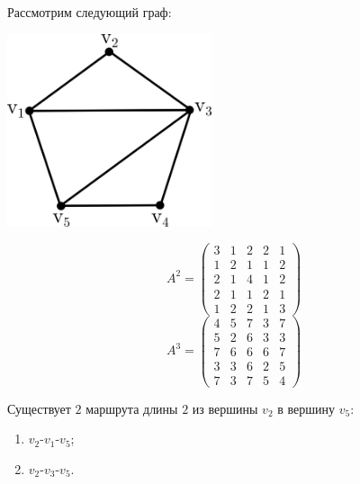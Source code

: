 \begin{example*}
    Рассмотрим следующий граф:

    \begin{multicols}{2}
        \null \vfill
        \begin{center}
            \includegraphics[width=0.45\textwidth]{images/adjacency-matrix-example.png}
        \end{center}
        \vfill \null

        \columnbreak

        \[
            A^2 =
            \begin{pmatrix}
                3 & 1 & 2 & 2 & 1 \\
                1 & 2 & 1 & 1 & 2 \\
                2 & 1 & 4 & 1 & 2 \\
                2 & 1 & 1 & 2 & 1 \\
                1 & 2 & 2 & 1 & 3
            \end{pmatrix}
        \]
        \[
            A^3 =
            \begin{pmatrix}
                4 & 5 & 7 & 3 & 7 \\
                5 & 2 & 6 & 3 & 3 \\
                7 & 6 & 6 & 6 & 7 \\
                3 & 3 & 6 & 2 & 5 \\
                7 & 3 & 7 & 5 & 4
            \end{pmatrix}
        \]
    \end{multicols}

    \noindent Существует \(2\) маршрута длины \(2\) из вершины \(v_2\) в вершину \(v_5\):
    \begin{enumerate}
        \item \(v_2\)-\(v_1\)-\(v_5\);
        \item \(v_2\)-\(v_3\)-\(v_5\).
    \end{enumerate}


\end{example*}
